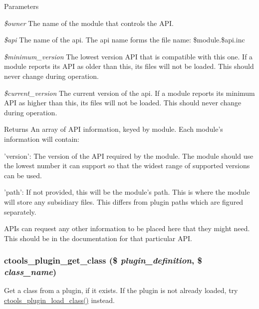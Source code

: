 \begin{DoxyParams}{Parameters}
\item[{\em \$owner}]The name of the module that controls the API. \item[{\em \$api}]The name of the api. The api name forms the file name: \$module.\$api.inc \item[{\em \$minimum\_\-version}]The lowest version API that is compatible with this one. If a module reports its API as older than this, its files will not be loaded. This should never change during operation. \item[{\em \$current\_\-version}]The current version of the api. If a module reports its minimum API as higher than this, its files will not be loaded. This should never change during operation.\end{DoxyParams}
\begin{DoxyReturn}{Returns}
An array of API information, keyed by module. Each module's information will contain:
\begin{DoxyItemize}
\item 'version': The version of the API required by the module. The module should use the lowest number it can support so that the widest range of supported versions can be used.
\item 'path': If not provided, this will be the module's path. This is where the module will store any subsidiary files. This differs from plugin paths which are figured separately.
\end{DoxyItemize}
\end{DoxyReturn}
APIs can request any other information to be placed here that they might need. This should be in the documentation for that particular API. \hypertarget{ctools_2includes_2plugins_8inc_a79a44a3c01ce410ebae10639f3b4436a}{
\subsubsection[{ctools\_\-plugin\_\-get\_\-class}]{\setlength{\rightskip}{0pt plus 5cm}ctools\_\-plugin\_\-get\_\-class (\$ {\em plugin\_\-definition}, \/  \$ {\em class\_\-name})}}
\label{ctools_2includes_2plugins_8inc_a79a44a3c01ce410ebae10639f3b4436a}
Get a class from a plugin, if it exists. If the plugin is not already loaded, try \hyperlink{ctools_2includes_2plugins_8inc_a4ad26242dff8fde79ed85d331fcf1198}{ctools\_\-plugin\_\-load\_\-class()} instead.


